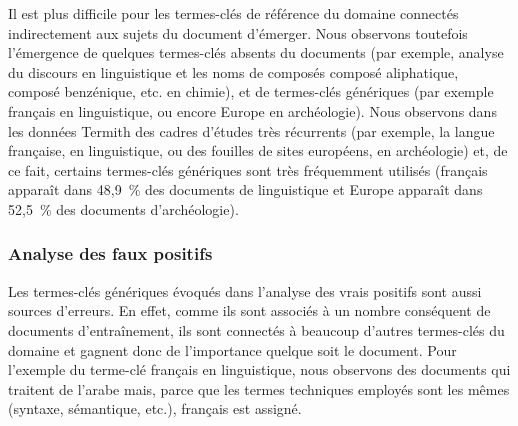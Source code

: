         Il est plus difficile pour les termes-clés de référence du domaine
        connectés indirectement aux sujets du document d'émerger. Nous observons
        toutefois l'émergence de quelques termes-clés absents du documents
        (par exemple, \og{}analyse du discours\fg{} en linguistique et
        les noms de composés \og{}composé aliphatique\fg{}, \og{}composé
        benzénique\fg{}, etc. en chimie), et de termes-clés génériques (par
        exemple \og{}français\fg{} en linguistique, ou encore \og{}Europe\fg{}
        en archéologie). Nous observons dans les données Termith des cadres
        d'études très récurrents (par exemple, la langue française, en
        linguistique, ou des fouilles de sites européens, en archéologie) et, de
        ce fait, certains termes-clés génériques sont très fréquemment utilisés
        (\og{}français\fg{} apparaît dans 48,9~\% des documents de linguistique
        et \og{}Europe\fg{} apparaît dans 52,5~\% des documents d'archéologie).

      \subsubsection{Analyse des faux positifs}
      \label{subsec:main-domain_specific_keyphrase_annotation-supervised_automatic_keyphrase_annotation-error_analysis-false_positives}
        Les termes-clés génériques évoqués dans l'analyse des vrais positifs
        sont aussi sources d'erreurs. En effet, comme ils sont associés à un
        nombre conséquent de documents d'entraînement, ils sont connectés à
        beaucoup d'autres termes-clés du domaine et gagnent donc de l'importance
        quelque soit le document. Pour l'exemple du terme-clé \og{}français\fg{}
        en linguistique, nous observons des documents qui traitent de l'arabe
        mais, parce que les termes techniques employés sont les mêmes
        (\og{}syntaxe\fg{}, \og{}sémantique\fg{}, etc.), \og{}français\fg{} est
        assigné.

